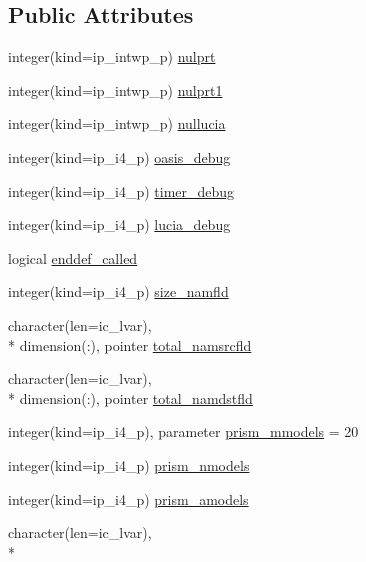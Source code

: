 \subsection*{Public Attributes}
\begin{DoxyCompactItemize}
\item 
integer(kind=ip\+\_\+intwp\+\_\+p) \hyperlink{classmod__oasis__data_af0f17b70f48598dac24f2e41ca0da4b2}{nulprt}
\item 
integer(kind=ip\+\_\+intwp\+\_\+p) \hyperlink{classmod__oasis__data_a2b9f5c72f10178df0bda39000b151d24}{nulprt1}
\item 
integer(kind=ip\+\_\+intwp\+\_\+p) \hyperlink{classmod__oasis__data_a46d81d5ac9efa619628264c5e45bac41}{nullucia}
\item 
integer(kind=ip\+\_\+i4\+\_\+p) \hyperlink{classmod__oasis__data_a51f2f4f66476cf893f2507722cd65958}{oasis\+\_\+debug}
\item 
integer(kind=ip\+\_\+i4\+\_\+p) \hyperlink{classmod__oasis__data_a320a34357de5c3049ccf102df7b97f5e}{timer\+\_\+debug}
\item 
integer(kind=ip\+\_\+i4\+\_\+p) \hyperlink{classmod__oasis__data_a7c427f27ff231565a1ecc0caeb30c67c}{lucia\+\_\+debug}
\item 
logical \hyperlink{classmod__oasis__data_a5341a9152ef540667f7fcaa4f04c6399}{enddef\+\_\+called}
\item 
integer(kind=ip\+\_\+i4\+\_\+p) \hyperlink{classmod__oasis__data_aa8588b3be582de7f61aa318d45854483}{size\+\_\+namfld}
\item 
character(len=ic\+\_\+lvar), \\*
dimension(\+:), pointer \hyperlink{classmod__oasis__data_a58b5a440f274f5dfb942d7e18f12674c}{total\+\_\+namsrcfld}
\item 
character(len=ic\+\_\+lvar), \\*
dimension(\+:), pointer \hyperlink{classmod__oasis__data_a81466361b20004007f221dd6a32041f9}{total\+\_\+namdstfld}
\item 
integer(kind=ip\+\_\+i4\+\_\+p), parameter \hyperlink{classmod__oasis__data_a11c61975c048981f7e508f1b6caf16b6}{prism\+\_\+mmodels} = 20
\item 
integer(kind=ip\+\_\+i4\+\_\+p) \hyperlink{classmod__oasis__data_a5915b02f461626d5a6cffbf037daa75e}{prism\+\_\+nmodels}
\item 
integer(kind=ip\+\_\+i4\+\_\+p) \hyperlink{classmod__oasis__data_ac73f95bc17215d09b67c6c4d3adc07b7}{prism\+\_\+amodels}
\item 
character(len=ic\+\_\+lvar), \\*

\end{DoxyCompactItemize}
